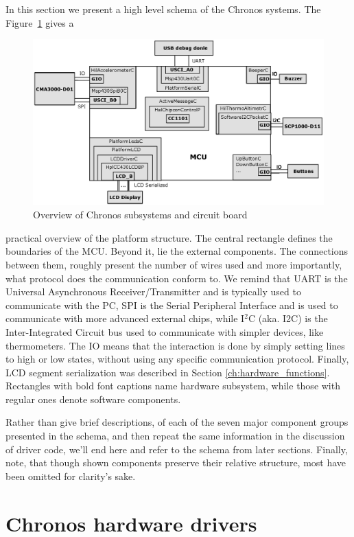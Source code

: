 In this section we present a high level schema of the Chronos systems. The Figure~\ref{fig:chronos_schema} gives a 
\begin{figure}[h]
  \centering
  \includegraphics[width=1.05\textwidth]{diagrams/chronos_schema.eps}
  \caption{Overview of Chronos subsystems and circuit board}
  \label{fig:chronos_schema}
\end{figure}
practical overview of the platform structure. The central rectangle defines the boundaries of the MCU. Beyond it, lie the external components. The connections between them, roughly present the number of wires used and more importantly, what protocol does the communication conform to. We remind that UART is the Universal Asynchronous Receiver/Transmitter and is typically used to communicate with the PC, SPI is the Serial Peripheral Interface and is used to communicate with more advanced external chips, while I$^2$C (aka. I2C) is the Inter-Integrated Circuit bus used to communicate with simpler devices, like thermometers. The IO means that the interaction is done by simply setting lines to high or low states, without using any specific communication protocol. Finally, LCD segment serialization was described in Section \ref{ch:hardware_functions}. Rectangles with bold font captions name hardware subsystem, while those with regular ones denote software components.

Rather than give brief descriptions, of each of the seven major component groups presented in the schema, and then repeat the same information in the discussion of driver code, we'll end here and refer to the schema from later sections. Finally, note, that though shown components preserve their relative structure, most have been omitted for clarity's sake.

\section{Chronos hardware drivers}

